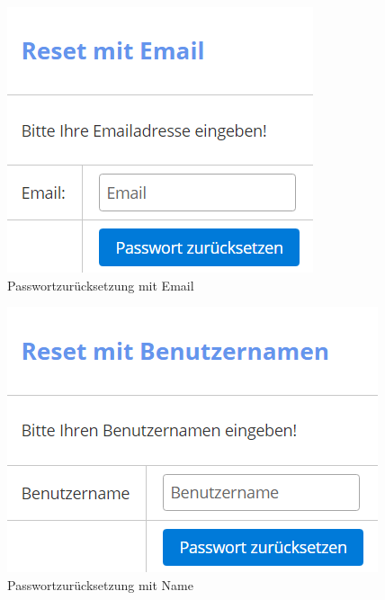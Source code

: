 \documentclass[enabledeprecatedfontcommands,fontsize=12pt,paper=a4,twoside]{scrartcl}
\begin{document}
\begin{figure}[h!]
\begin{center}
 \includegraphics[width=\textwidth]{screenshots/allgemein/resetemail.png}
  \caption{Passwortzurücksetzung mit Email}
  \label{fig:boat1}
\end{center}
\end{figure}

\begin{figure}[h!]
\begin{center}
 \includegraphics[scale=0.6]{screenshots/allgemein/resetname.png}
  \caption{Passwortzurücksetzung mit Name}
  \label{fig:boat1}
\end{center}
\end{figure}
\end{document}
